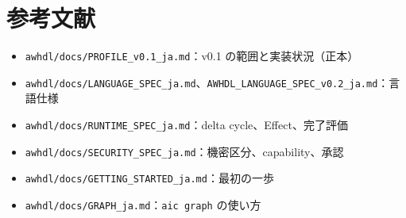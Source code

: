 \documentclass[a4paper,11pt]{ltjsarticle}
\begin{document}
\section{参考文献}

\begin{itemize}
  \item \texttt{awhdl/docs/PROFILE\_v0.1\_ja.md}：v0.1 の範囲と実装状況（正本）
  \item \texttt{awhdl/docs/LANGUAGE\_SPEC\_ja.md}、\texttt{AWHDL\_LANGUAGE\_SPEC\_v0.2\_ja.md}：言語仕様
  \item \texttt{awhdl/docs/RUNTIME\_SPEC\_ja.md}：delta cycle、Effect、完了評価
  \item \texttt{awhdl/docs/SECURITY\_SPEC\_ja.md}：機密区分、capability、承認
  \item \texttt{awhdl/docs/GETTING\_STARTED\_ja.md}：最初の一歩
  \item \texttt{awhdl/docs/GRAPH\_ja.md}：\texttt{aic graph} の使い方
\end{itemize}
\end{document}
